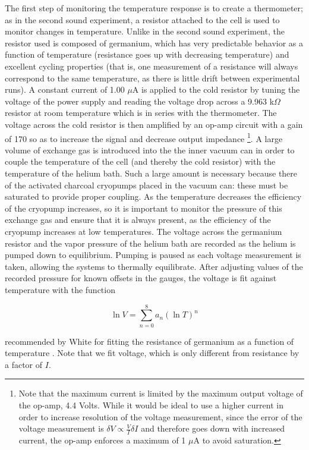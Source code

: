 The first step of monitoring the temperature response is to create a thermometer; as in the second sound experiment, a resistor attached to the cell is used to monitor changes in temperature. Unlike in the second sound experiment, the resistor used is composed of germanium, which has very predictable behavior as a function of temperature (resistance goes up with decreasing temperature) and excellent cycling properties (that is, one measurement of a resistance will always correspond to the same temperature, as there is little drift between experimental runs). A constant current of 1.00 $\mu$A is applied to the cold resistor by tuning the voltage of the power supply and reading the voltage drop across a 9.963 k$\Omega$ resistor at room temperature which is in series with the thermometer. The voltage across the cold resistor is then amplified by an op-amp circuit with a gain of 170 so as to increase the signal and decrease output impedance \footnote{Note that the maximum current is limited by the maximum output voltage of the op-amp, 4.4 Volts. While it would be ideal to use a higher current in order to increase resolution of the voltage measurement, since the error of the voltage measurement is $\delta V \propto \frac{V}{I} \delta I$ and therefore goes down with increased current, the op-amp enforces a maximum of 1 $\mu$A to avoid saturation.}. A large volume of exchange gas is introduced into the the inner vacuum can in order to couple the temperature of the cell (and thereby the cold resistor) with the temperature of the helium bath. Such a large amount is necessary because there of the activated charcoal cryopumps placed in the vacuum can: these must be saturated to provide proper coupling. As the temperature decreases the efficiency of the cryopump increases, so it is important to monitor the pressure of this exchange gas and ensure that it is always present, as the efficiency of the cryopump increases at low temperatures. The voltage across the germanium resistor and the vapor pressure of the helium bath are recorded as the helium is pumped down to equilibrium. Pumping is paused as each voltage measurement is taken, allowing the systems to thermally equilibrate. After adjusting values of the recorded pressure for known offsets in the gauges, the voltage is fit against temperature with the function

\begin{equation}
\label{eq:fiteqn}
\ln{V} = \sum_{n=0}^{8} a_{n} (\ln{T})^{n}
\end{equation}

recommended by White for fitting the resistance of germanium as a function of temperature  \cite[p.~140]{white}. Note that we fit voltage, which is only different from resistance by a factor of $I$.

